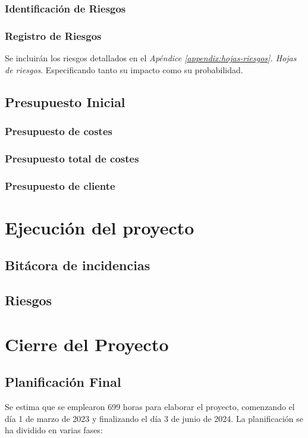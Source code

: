 \subsubsection{Identificación de Riesgos}

\subsubsection{Registro de Riesgos}
Se incluirán los riesgos detallados en el \textit{Apéndice \ref{appendix:hojas-riesgos}. Hojas de riesgos}. Especificando tanto su impacto como su probabilidad.
\subsection{Presupuesto Inicial}

\subsubsection{Presupuesto de costes}

\subsubsection{Presupuesto total de costes}

\subsubsection{Presupuesto de cliente}

\section{Ejecución del proyecto}
\subsection{Bitácora de incidencias}

\subsection{Riesgos}

\section{Cierre del Proyecto}
\subsection{Planificación Final}
Se estima que se emplearon 699 horas para elaborar el proyecto, comenzando el día 1 de marzo de
2023 y finalizando el día 3 de junio de 2024.
La planificación se ha dividido en varias fases:

